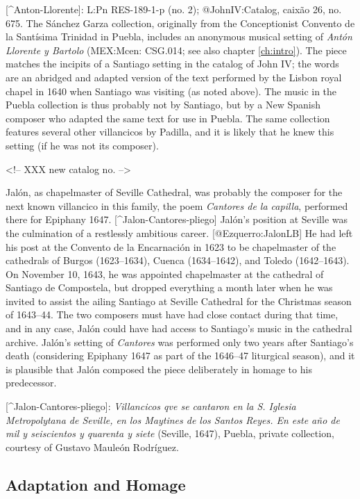 [^Anton-Llorente]:
L:Pn RES-189-1-p (no. 2); @JohnIV:Catalog, caixão 26, no. 675.
The Sánchez Garza collection, originally from the Conceptionist Convento de la
Santísima Trinidad in Puebla, includes an anonymous musical setting of \emph{Antón
Llorente y Bartolo} (MEX:Mcen: CSG.014; see also chapter \ref{ch:intro}).
The piece matches the incipits of a Santiago setting in the catalog of John IV;
the words are an abridged and adapted version of the text performed by the
Lisbon royal chapel in 1640 when Santiago was visiting (as noted above).
The music in the Puebla collection is thus probably not by Santiago, but by a
New Spanish composer who adapted the same text for use in Puebla.
The same collection features several other villancicos by Padilla, and it is
likely that he knew this setting (if he was not its composer).

<!-- XXX new catalog no. -->


Jalón, as chapelmaster of Seville Cathedral, was probably the composer for the
next known villancico in this family, the poem \emph{Cantores de la capilla},
performed there for Epiphany 1647.
[^Jalon-Cantores-pliego]
Jalón's position at Seville was the culmination of a restlessly ambitious
career.
[@Ezquerro:JalonLB]
He had left his post at the Convento de la Encarnación in 1623 to be
chapelmaster of the cathedrals of Burgos (1623--1634), Cuenca (1634--1642), and
Toledo (1642--1643).
On November 10, 1643, he was appointed chapelmaster at the cathedral of Santiago
de Compostela, but dropped everything a month later when he was invited to
assist the ailing Santiago at Seville Cathedral for the Christmas season of
1643--44.
The two composers must have had close contact during that time, and in any case,
Jalón could have had access to Santiago's music in the cathedral archive.
Jalón's setting of \emph{Cantores} was performed only two years after Santiago's
death (considering Epiphany 1647 as part of the 1646--47 liturgical season), and
it is plausible that Jalón composed the piece deliberately in homage to his
predecessor.

[^Jalon-Cantores-pliego]:
\emph{Villancicos qve se cantaron en la S. Iglesia Metropolytana de Seville, en los
Maytines de los Santos Reyes.
En este año de mil y seiscientos y quarenta y siete} (Seville, 1647), Puebla,
private collection, courtesy of Gustavo Mauleón Rodríguez.

\subsection{Adaptation and Homage}


